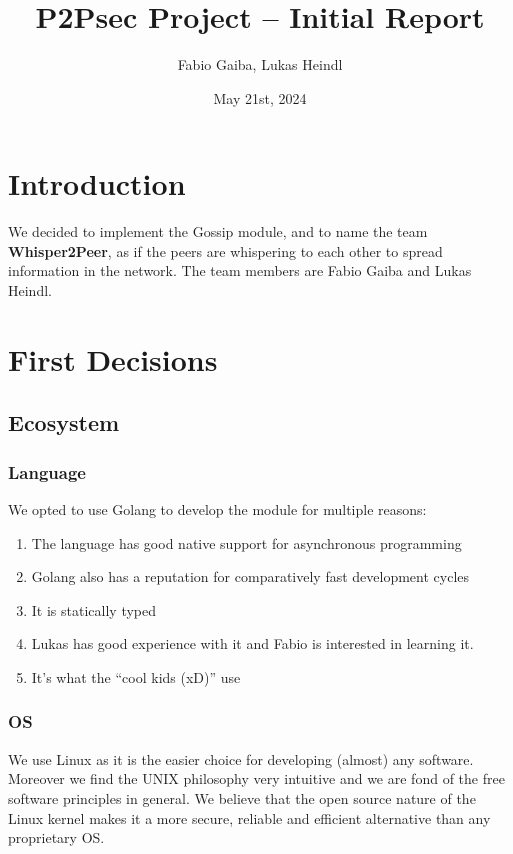 \documentclass[a4paper,english,10pt,NET]{tumarticle}
\title{P2Psec Project -- Initial Report}
\author{Fabio Gaiba, Lukas Heindl}
\date{May 21st, 2024}
\begin{document}
\maketitle
\thispagestyle{tumarticle}

\section{Introduction}

We decided to implement the Gossip module, and to name the team \textbf{Whisper2Peer}, as if the peers are whispering to each other to spread information in the network. The team members are Fabio Gaiba and Lukas Heindl.




\section{First Decisions}
\subsection{Ecosystem}
\subsubsection{Language}

We opted to use Golang to develop the module for multiple reasons:

\begin{enumerate}
	\item The language has good native support for asynchronous programming 
	\item Golang also has a reputation for comparatively fast development cycles
	\item It is statically typed  
	\item Lukas has good experience with it and Fabio is interested in learning it.
	\item It's what the \enquote{cool kids (xD)} use
\end{enumerate}

\subsubsection{OS}
We use Linux as it is the easier choice for developing (almost) any software. Moreover we find the UNIX philosophy very intuitive and we are fond of the free software principles in general. We believe that the open source nature of the Linux kernel makes it a more secure, reliable and efficient alternative than any proprietary OS.
\end{document}
